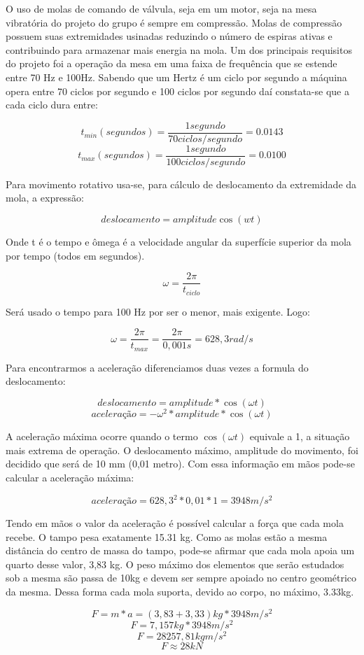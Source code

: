 O uso de molas de comando de válvula, seja em um motor, seja na mesa vibratória do projeto do grupo é sempre em compressão. Molas de compressão possuem suas extremidades usinadas reduzindo o número de espiras ativas e contribuindo para armazenar mais energia na mola.
Um dos principais requisitos do projeto foi a operação da mesa em uma faixa de frequência que se estende entre 70 Hz e 100Hz. Sabendo que um Hertz é um ciclo por segundo a máquina opera entre 70 ciclos por segundo e 100 ciclos por segundo daí constata-se que a cada ciclo dura entre:

$$t_{min} (segundos)=\frac{1segundo}{70 ciclos/segundo}=0.0143$$
$$t_{max} (segundos)=\frac{1segundo}{100 ciclos/segundo}=0.0100$$

Para movimento rotativo usa-se, para cálculo de deslocamento da extremidade da mola, a expressão:

$$deslocamento=amplitude \cos(wt)$$

Onde t é o tempo e ômega é a velocidade angular da superfície superior da mola por tempo (todos em segundos).

$$\omega=\frac{2\pi}{t_{ciclo}}$$

Será usado o tempo para 100 Hz por ser o menor, mais exigente. Logo:

$$\omega=\frac{2\pi}{t_{max}}=\frac{2\pi}{0,001s}=628,3rad/s$$

Para encontrarmos a aceleração diferenciamos duas vezes a formula do deslocamento:

$$deslocamento=amplitude * \cos(\omega t)$$
$$aceleração=-\omega^2 * amplitude * \cos(\omega t)$$

A aceleração máxima ocorre quando o termo $\cos(\omega t)$ equivale a 1, a situação mais extrema de operação. O deslocamento máximo, amplitude do movimento, foi decidido que será de 10 mm (0,01 metro). Com essa informação em mãos pode-se calcular a aceleração máxima:


$$aceleração =628,3^2 * 0,01 *1 =3948m/s^2 $$

Tendo em mãos o valor da aceleração é possível calcular a força que cada mola recebe. O tampo pesa exatamente 15.31 kg. Como as molas estão a mesma distância do centro de massa do tampo, pode-se afirmar que cada mola apoia um quarto desse valor, 3,83 kg. O peso máximo dos elementos que serão estudados sob a mesma são passa de 10kg e devem ser sempre apoiado no centro geométrico da mesma. Dessa forma cada mola suporta, devido ao corpo, no máximo, 3.33kg.

$$ F=m*a=(3,83+3,33)kg*3948m/s^2$$
$$ F=7,157kg*3948m/s^2$$
$$F=28257,81kg m/s^2$$
$$F\approx 28kN$$

